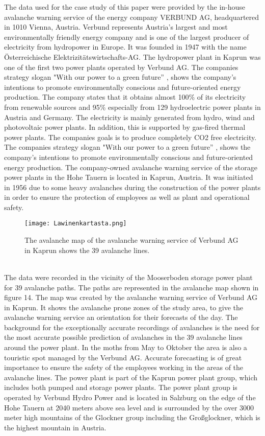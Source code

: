\documentclass[../masterarbeit.tex]{subfiles}
\begin{document}
The data used for the case study of this paper were provided by the in-house avalanche warning service of the energy company VERBUND AG, headquartered in 1010 Vienna, Austria. Verbund represents Austria's largest and most environmentally friendly  energy company and is one of the largest producer of electricity from hydropower in Europe. It was founded in 1947 with the name Österreichische Elektrizitätswirtschafts-AG. The hydropower plant in Kaprun was one of the first two power plants operated by Verbund AG. \autocite[]{Verbund:2022} The companies strategy slogan "With our power to a green future” \autocite[]{Verbund:2022}, shows the company's intentions to promote environmentally conscious and future-oriented energy production. The company states that it obtains almost 100\% of its electricity from renewable sources and 95\% especially from 129 hydroelectric power plants in Austria and Germany. The electricity is mainly generated from hydro, wind and photovoltaic power plants. In addition, this is supported by gas-fired thermal power plants. The companies goals is to produce completely CO2 free electricity. \autocite[]{Verbund:2022} 
The companies strategy slogan "With our power to a green future” \autocite[]{Verbund:2022}, shows the company's intentions to promote environmentally conscious and future-oriented energy production. 
The company-owned avalanche warning service of the storage power plants in the Hohe Tauern is located in Kaprun, Austria. It was initiated in 1956 due to some heavy avalanches during the construction of the power plants in order to ensure the protection of employees as well as plant and operational safety.
\begin{figure}[h]
    \centering
    \texttt{[image: Lawinenkartasta.png]}
    \caption{The avalanche map of the avalanche warning service of Verbund AG in Kaprun shows the 39 avalanche lines.}
\end{figure} \\
The data were recorded in the vicinity of the Mooserboden storage power plant for 39 avalanche paths. The paths are represented in the avalanche map shown in figure 14. The map was created by the avalanche warning service of Verbund AG in Kaprun. It shows the avalanche prone zones of the study area, to give the avalanche warning service an orientation for their forecasts of the day. The background for the exceptionally accurate recordings of avalanches is the need for the most accurate possible prediction of avalanches in the 39 avalanche lines around the power plant. In the moths from May to Oktober the area is also a touristic spot managed by the Verbund AG\textcite[]{VerbundKaprun:2022}. Accurate forecasting is of great importance to ensure the safety of the employees working in the areas of the avalanche lines. The power plant is part of the Kaprun power plant group, which includes both pumped and storage power plants. The power plant group is operated by Verbund Hydro Power and is located in Salzburg on the edge of the Hohe Tauern at 2040 meters above sea level and is surrounded by the over 3000 meter high mountains of the Glockner group including the Großglockner, which is the highest mountain in Austria. \autocite[]{VerbundKaprun:2022}
 
\end{document}
